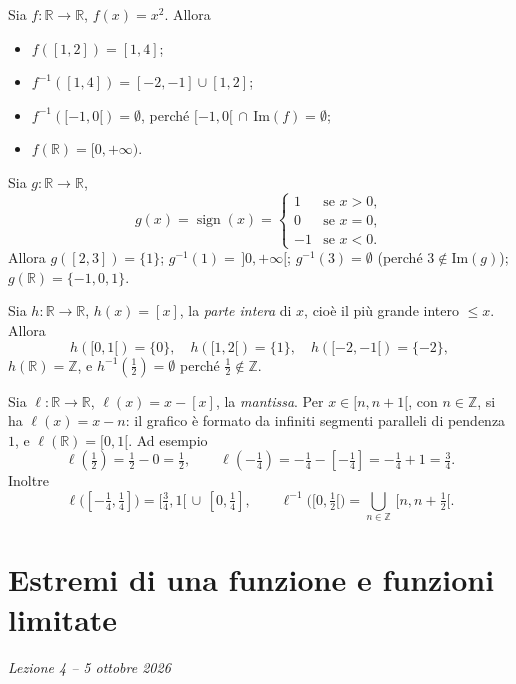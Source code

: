 \documentclass[11pt,a4paper]{article}
\begin{document}
\begin{esempio}[$f(x) = x^2$]
Sia $f : \mathbb{R} \to \mathbb{R}$, $f(x) = x^2$. Allora
\begin{itemize}
    \item $f([1, 2]) = [1, 4]$;
    \item $f^{-1}([1, 4]) = [-2, -1] \cup [1, 2]$;
    \item $f^{-1}([-1, 0[) = \emptyset$, perché $[-1, 0[ \,\cap\, \mathrm{Im}(f) = \emptyset$;
    \item $f(\mathbb{R}) = [0, +\infty)$.
\end{itemize}
\end{esempio}

\begin{esempio}
Sia $g : \mathbb{R} \to \mathbb{R}$,
\[
g(x) = \operatorname{sign}(x) = \begin{cases} 1 & \text{se } x > 0, \\ 0 & \text{se } x = 0, \\ -1 & \text{se } x < 0. \end{cases}
\]
Allora $g([2, 3]) = \{1\}$; $g^{-1}(1) = \,]0, +\infty[$; $g^{-1}(3) = \emptyset$ (perché $3 \notin \mathrm{Im}(g)$); $g(\mathbb{R}) = \{-1, 0, 1\}$.
\end{esempio}

\begin{esempio}
Sia $h : \mathbb{R} \to \mathbb{R}$, $h(x) = [x]$, la \emph{parte intera} di $x$, cioè il più grande intero $\leq x$. Allora
\[
h([0, 1[) = \{0\}, \quad h([1, 2[) = \{1\}, \quad h([-2, -1[) = \{-2\},
\]
$h(\mathbb{R}) = \mathbb{Z}$, e $h^{-1}(\tfrac12) = \emptyset$ perché $\frac12 \notin \mathbb{Z}$.
\end{esempio}

\begin{esempio}[Mantissa]
Sia $\ell : \mathbb{R} \to \mathbb{R}$, $\ell(x) = x - [x]$, la \emph{mantissa}. Per $x \in [n, n+1[$, con $n \in \mathbb{Z}$, si ha $\ell(x) = x - n$: il grafico è formato da infiniti segmenti paralleli di pendenza $1$, e $\ell(\mathbb{R}) = [0, 1[$. Ad esempio
\[
\ell(\tfrac12) = \tfrac12 - 0 = \tfrac12, \qquad
\ell(-\tfrac14) = -\tfrac14 - [-\tfrac14] = -\tfrac14 + 1 = \tfrac34.
\]
Inoltre
\[
\ell\big([-\tfrac14, \tfrac14]\big) = [\tfrac34, 1[ \,\cup\, [0, \tfrac14],
\qquad
\ell^{-1}\big([0, \tfrac12[\big) = \bigcup_{n \in \mathbb{Z}} \,[n, n + \tfrac12[.
\]
\end{esempio}

\section[Estremi di una funzione e funzioni limitate (Lezione 4 -- 5 ottobre 2026)]{Estremi di una funzione e funzioni limitate}
\noindent\emph{Lezione 4 -- 5 ottobre 2026}
\end{document}
